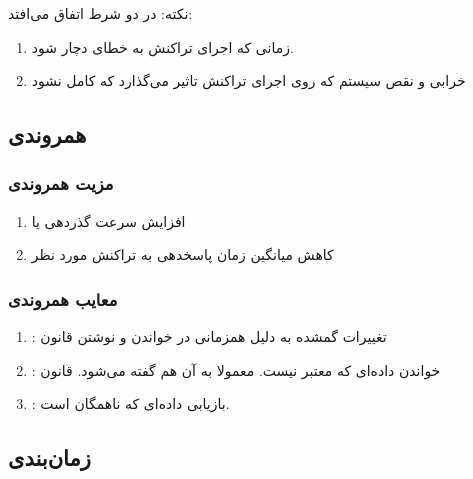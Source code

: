\documentclass[a4paper]{article}
\begin{document}
نکته:  در دو شرط اتفاق می‌افتد:

\begin{enumerate}
    \item زمانی که اجرای تراکنش به خطای  دچار شود.
    \item خرابی و نقص سیستم که روی اجرای تراکنش تاثیر می‌گذارد که کامل نشود
\end{enumerate}


\newpage

\subsection{همروندی}

\subsubsection{مزیت همروندی}

\begin{enumerate}
    \item افزایش سرعت گذردهی یا 
    \item کاهش میانگین زمان پاسخدهی به تراکنش مورد نظر
\end{enumerate}

\subsubsection{معایب همروندی} 

\begin{enumerate}
    \item {}: تغییرات گمشده به دلیل همزمانی در خواندن و نوشتن
    قانون 
    \item {}: خواندن داده‌ای که معتبر نیست. معمولا به آن  هم گفته می‌شود. قانون 
    \item {}: بازیابی داده‌ای که ناهمگان است. 
\end{enumerate}

\subsection{زمان‌بندی}
\end{document}
